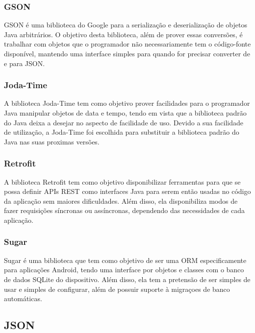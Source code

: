 \documentclass[
	article,			%
	11pt,				%
	oneside,			%
	a4paper,			%
	english,			%
	brazil,				%
	sumario=tradicional
	]{abntex2}
\begin{document}
\subsubsection{GSON}

GSON é uma biblioteca do Google para a serialização e deserialização de objetos Java arbitrários.
O objetivo desta biblioteca, além de prover essas conversões, é trabalhar com objetos que o programador não necessariamente tem o código-fonte disponível, mantendo uma interface simples para quando for precisar converter de e para JSON. \cite{gson}

\subsubsection{Joda-Time}

A biblioteca Joda-Time tem como objetivo prover facilidades para o programador Java manipular objetos de data e tempo, tendo em vista que a biblioteca padrão do Java deixa a desejar no aspecto de facilidade de uso.
Devido a sua facilidade de utilização, a Joda-Time foi escolhida para substituir a biblioteca padrão do Java nas suas proximas versões.\cite{jodatime}

\subsubsection{Retrofit}

A biblioteca Retrofit tem como objetivo disponibilizar ferramentas para que se possa definir APIs REST como interfaces Java para serem então usadas no código da aplicação sem maiores dificuldades.
Além disso, ela disponibiliza modos de fazer requisições síncronas ou assíncronas, dependendo das necessidades de cada aplicação.\cite{retrofit}

\subsubsection{Sugar}

Sugar é uma biblioteca que tem como objetivo de ser uma ORM especificamente para aplicações Android, tendo uma interface por objetos e classes com o banco de dados SQLite do dispositivo.
Além disso, ela tem a pretensão de ser simples de usar e simples de configurar, além de possuir suporte à migraçoes de banco automáticas.\cite{sugar}

\subsection{JSON}
\end{document}
